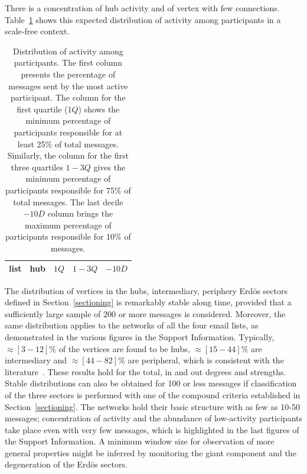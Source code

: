 \documentclass[%
 aip,
 jmp,%
 amsmath,amssymb,
 reprint,%
]{revtex4-1}
\begin{document}
There is a concentration of hub activity and of vertex with few connections. Table~\ref{autores} shows this expected distribution of activity among participants in a scale-free context.

\begin{table}[h]
    \caption{Distribution of activity among participants. The first column presents the percentage of messages sent by the most active participant. The column for the first quartile ($1Q$) shows the minimum percentage of participants responsible for at least 25\% of total messages. Similarly, the column for the first three quartiles $1-3Q$ gives the minimum percentage of participants responsible for 75\% of total messages. The last decile $-10D$ column brings the maximum percentage of participants responsible for 10\% of messages.}
\begin{center}
    \begin{tabular}{ | l ||  c | c | c | c | }
        \hline
        list & hub & $ 1Q $ & $ 1-3Q $ & $-10D$ \\ \hline
	
    \end{tabular}
\end{center}
\label{autores}
\end{table}

The distribution of vertices in the hubs, intermediary, periphery Erd\"os sectors defined in Section~\ref{sectioning} is remarkably stable along time, provided that a sufficiently large sample of 200 or more messages is considered. 
Moreover, the same distribution applies to the networks of all the four email lists, as demonstrated in the various figures in the Support Information. 
Typically, $\approx [3-12]\%$ of the vertices are found to be hubs, $\approx [15-44]\%$ are intermediary and $\approx [44-82]\%$ are peripheral, which is consistent with the literature~\cite{secFree}.
These results hold for the total, in and out degrees and strengths.
Stable distributions can also be obtained for 100 or less messages if classification of the three sectors is performed with one of the compound criteria established in Section~\ref{sectioning}. 
The networks hold their basic structure with as few as 10-50 messages; concentration of activity and the abundance of low-activity participants take place even with very few messages, which is highlighted in the last figures of the Support Information.
A minimum window size for observation of more general properties might be inferred by monitoring the giant component and the degeneration of the Erd\"os sectors.
\end{document}
